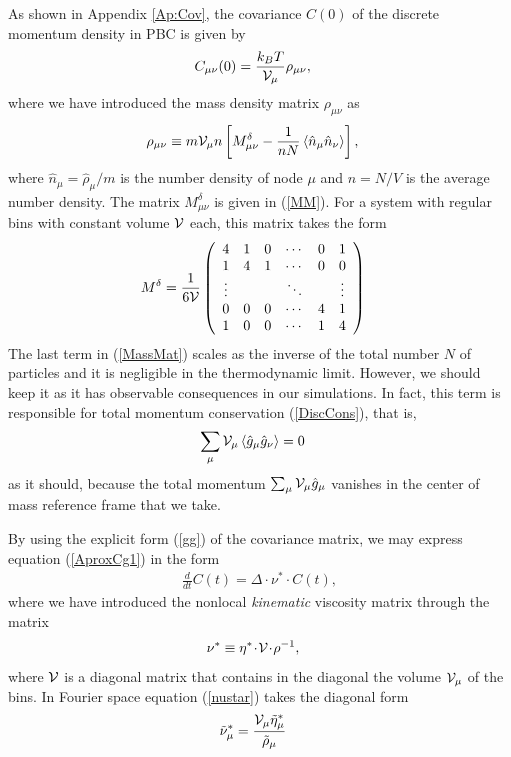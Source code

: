 \documentclass[b5paper,openright,10pt]{book}
\newcommand{\esc}{\!\cdot\!}
\newcommand{\llangle}{\left\langle}
\newcommand{\rrangle}{\right\rangle}
\begin{document}
As  shown  in Appendix  \ref{Ap:Cov},  the  covariance $C(0)$  of  the
discrete momentum density in PBC is given by
\begin{align}
C_{\mu\nu}(0)&= \frac{k_BT}{{\cal V}_\mu} \rho_{\mu\nu},
\label{gg}
\end{align}
where we have introduced the mass density matrix $\rho_{\mu\nu}$ as
\begin{align}
  \rho_{\mu\nu}&\equiv  m{\cal V}_\mu n \left[ M^\delta_{\mu\nu}-
\frac{1}{n N}  \llangle \hat{n}_\mu\hat{n}_\nu\rrangle\right],
\label{MassMat}
\end{align}
where  $\hat{n}_\mu=\hat{\rho}_\mu/m$ is  the number  density  of node $\mu$ and $n=N/V$  is the  average
number density.  The
matrix $M^\delta_{\mu\nu}$ is given in (\ref{MM}).
For a system  with regular bins with constant volume  ${\cal V}$ each,
this matrix takes the form
\begin{align}
{M}^\delta&=\frac{1}{6{\cal V}}
\left(\begin{array}{cccccc}
4&1&0&\cdots &0&1\\
1&4&1&\cdots &0&0\\
\vdots&&&\ddots&&\vdots\\
0&0&0&\cdots &4&1\\
1&0&0&\cdots&1&4
\end{array}\right)
\end{align}
The last  term in (\ref{MassMat}) scales  as the inverse of  the total
number  $N$ of  particles and  it is  negligible in  the thermodynamic
limit.  However, we  should keep it as it  has observable consequences
in  our simulations.   In fact,  this  term is  responsible for  total
momentum conservation (\ref{DiscCons}), that is,
\begin{align}
  \sum_\mu{\cal V}_\mu\llangle \hat{g}_\mu\hat{g}_\nu\rrangle &=0
\end{align}
as   it   should,   because    the   total   momentum   $\sum_\mu{\cal
  V}_\mu\hat{g}_\mu$ vanishes  in the  center of mass  reference frame
that we take.

By using the explicit form (\ref{gg}) of the covariance matrix, we may
express equation (\ref{AproxCg1}) in the form
\begin{align}
\frac{d}{dt}C(t)= \Delta\esc \nu^*\esc C(t),
\label{SDECpi}
\end{align}
where we  have introduced  the nonlocal  \textit{kinematic} viscosity
matrix through the matrix
\begin{align}
\nu^*&\equiv  \eta^*\esc{\cal V}\esc \rho^{-1},
\label{nustar}
\end{align}
where ${\cal  V}$ is a diagonal  matrix that contains in  the diagonal
the volume ${\cal  V}_\mu$ of the bins.   In Fourier space equation (\ref{nustar})
takes the diagonal form
\begin{align}
  \tilde{\nu}_\mu^*&=  \frac{{\cal V}_\mu \tilde{\eta}_\mu^*}{\tilde{\rho}_\mu}
  \label{nustartilde}
\end{align}
\end{document}
